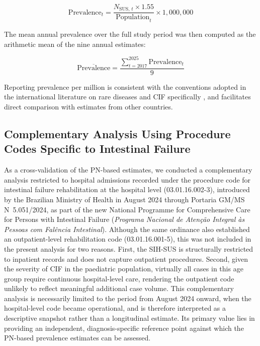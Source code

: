 \documentclass[pdflatex,sn-mathphys-num]{sn-jnl}
\theoremstyle{thmstyleone}%
\theoremstyle{thmstyletwo}%
\theoremstyle{thmstylethree}%
\begin{document}
\begin{equation}
    \text{Prevalence}_{t} = \frac{N_{\text{SUS},\, t} \times 1.55}{\text{Population}_{t}} \times 1{,}000{,}000
\end{equation}

The mean annual prevalence over the full study period was then computed as the arithmetic mean of the nine annual estimates:

\begin{equation}
    \overline{\text{Prevalence}} = \frac{\displaystyle\sum_{t=2017}^{2025} \text{Prevalence}_{t}}{9}
\end{equation}

Reporting prevalence per million is consistent with the conventions adopted in the international literature on rare diseases and CIF specifically \cite{beath2011trends, antunes2020portuguese, mukhopadhyay2019}, and facilitates direct comparison with estimates from other countries.

\subsection*{Complementary Analysis Using Procedure Codes Specific to Intestinal Failure}

As a cross-validation of the PN-based estimates, we conducted a complementary analysis restricted to hospital admissions recorded under the procedure code for intestinal failure rehabilitation at the hospital level (03.01.16.002-3), introduced by the Brazilian Ministry of Health in August 2024 through Portaria GM/MS N\textordmasculine~5.051/2024, as part of the new National Programme for Comprehensive Care for Persons with Intestinal Failure (\textit{Programa Nacional de Aten\c{c}\~ao Integral \`{a}s Pessoas com Fal\^{e}ncia Intestinal}). Although the same ordinance also established an outpatient-level rehabilitation code (03.01.16.001-5), this was not included in the present analysis for two reasons. First, the SIH-SUS is structurally restricted to inpatient records and does not capture outpatient procedures. Second, given the severity of CIF in the paediatric population, virtually all cases in this age group require continuous hospital-level care, rendering the outpatient code unlikely to reflect meaningful additional case volume. This complementary analysis is necessarily limited to the period from August 2024 onward, when the hospital-level code became operational, and is therefore interpreted as a descriptive snapshot rather than a longitudinal estimate. Its primary value lies in providing an independent, diagnosis-specific reference point against which the PN-based prevalence estimates can be assessed.
\end{document}
